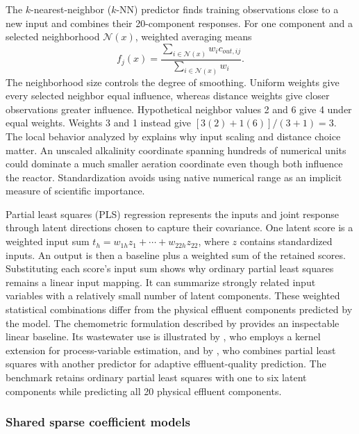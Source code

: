 The $k$-nearest-neighbor ($k$-NN) predictor finds training observations close to a new input and combines their 20-component responses. For one component and a selected neighborhood $\mathcal N(x)$, weighted averaging means
\[
f_j(x)=\frac{\sum_{i\in\mathcal N(x)}w_i c_{out,ij}}{\sum_{i\in\mathcal N(x)}w_i}.
\]
The neighborhood size controls the degree of smoothing. Uniform weights give every selected neighbor equal influence, whereas distance weights give closer observations greater influence. Hypothetical neighbor values 2 and 6 give 4 under equal weights. Weights 3 and 1 instead give $[3(2)+1(6)]/(3+1)=3$. The local behavior analyzed by \citet{Mack1981} explains why input scaling and distance choice matter. An unscaled alkalinity coordinate spanning hundreds of numerical units could dominate a much smaller aeration coordinate even though both influence the reactor. Standardization avoids using native numerical range as an implicit measure of scientific importance.

Partial least squares (PLS) regression represents the inputs and joint response through latent directions chosen to capture their covariance. One latent score is a weighted input sum $t_h=w_{1h}z_1+\cdots+w_{22h}z_{22}$, where $z$ contains standardized inputs. An output is then a baseline plus a weighted sum of the retained scores. Substituting each score's input sum shows why ordinary partial least squares remains a linear input mapping. It can summarize strongly related input variables with a relatively small number of latent components. These weighted statistical combinations differ from the physical effluent components predicted by the model. The chemometric formulation described by \citet{Wold2001} provides an inspectable linear baseline. Its wastewater use is illustrated by \citet{Woo2009}, who employs a kernel extension for process-variable estimation, and by \citet{Yang2021}, who combines partial least squares with another predictor for adaptive effluent-quality prediction. The benchmark retains ordinary partial least squares with one to six latent components while predicting all 20 physical effluent components.

\subsubsection{Shared sparse coefficient models}


